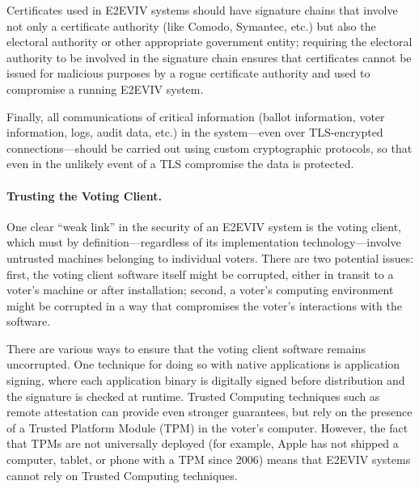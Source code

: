 Certificates used in E2EVIV systems should have signature chains that
involve not only a certificate authority (like Comodo, Symantec, etc.)
but also the electoral authority or other appropriate government
entity; requiring the electoral authority to be involved in the
signature chain ensures that certificates cannot be issued for
malicious purposes by a rogue certificate authority and used to
compromise a running E2EVIV system.

Finally, all communications of critical information (ballot
information, voter information, logs, audit data, etc.) in the
system---even over TLS-encrypted connections---should be carried out
using custom cryptographic protocols, so that even in the unlikely
event of a TLS compromise the data is protected.

\paragraph{Trusting the Voting Client.} One clear ``weak link'' in the
security of an E2EVIV system is the voting client, which must by
definition---regardless of its implementation technology---involve
untrusted machines belonging to individual voters. There are two
potential issues: first, the voting client software itself might be
corrupted, either in transit to a voter's machine or after
installation; second, a voter's computing environment might be
corrupted in a way that compromises the voter's interactions with the
software.

There are various ways to ensure that the voting client software
remains uncorrupted. One technique for doing so with native
applications is application signing, where each application binary is
digitally signed before distribution and the signature is checked at
runtime. Trusted Computing techniques such as remote attestation can
provide even stronger guarantees, but rely on the presence of a
Trusted Platform Module (TPM) in the voter's computer.  However, the
fact that TPMs are not universally deployed (for example, Apple has
not shipped a computer, tablet, or phone with a TPM since 2006) means
that E2EVIV systems cannot rely on Trusted Computing techniques.

